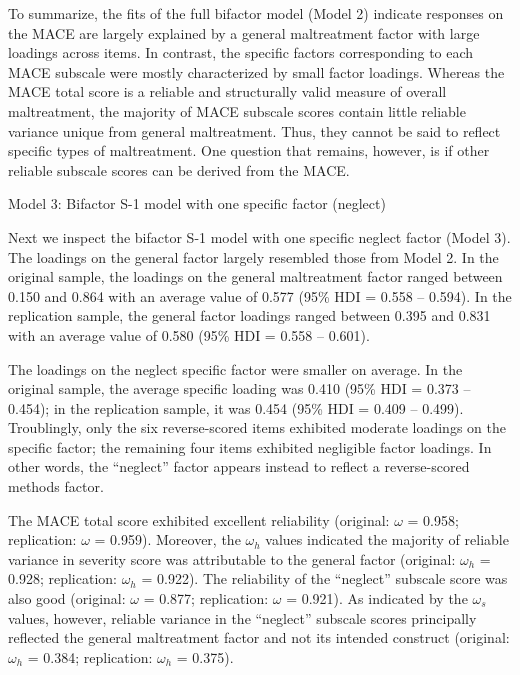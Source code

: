 \documentclass[letterpaper,man,natbib,longtable,floatsintext,12pt]{apa6}
\makeatletter
\renewcommand{\subsubsection}{\@startsection{subsubsection}{3}
  {\z@}%
  {\b@level@two@skip}{\e@level@two@skip}%
  {\normalfont\normalsize\bfseries}}
\makeatother
\begin{document}
To summarize, the fits of the full bifactor model (Model 2) indicate responses on the MACE are largely explained by a general maltreatment factor with large loadings across items. In contrast, the specific factors corresponding to each MACE subscale were mostly characterized by small factor loadings. Whereas the MACE total score is a reliable and structurally valid measure of overall maltreatment, the majority of MACE subscale scores contain little reliable variance unique from general maltreatment. Thus, they cannot be said to reflect specific types of maltreatment. One question that remains, however, is if other reliable subscale scores can be derived from the MACE. 

\subsubsection{Model 3: Bifactor S-1 model with one specific factor (neglect)}

Next we inspect the bifactor S-1 model with one specific neglect factor (Model 3). The loadings on the general factor largely resembled those from Model 2. In the original sample, the loadings on the general maltreatment factor ranged between 0.150 and 0.864 with an average value of 0.577 (95\% HDI = 0.558 -- 0.594). In the replication sample, the general factor loadings ranged between 0.395 and 0.831 with an average value of 0.580 (95\% HDI = 0.558 -- 0.601). 

The loadings on the neglect specific factor were smaller on average. In the original sample, the average specific loading was 0.410 (95\% HDI = 0.373 -- 0.454); in the replication sample, it was 0.454 (95\% HDI = 0.409 -- 0.499). Troublingly, only the six reverse-scored items exhibited moderate loadings on the specific factor; the remaining four items exhibited negligible factor loadings. In other words, the ``neglect'' factor appears instead to reflect a reverse-scored methods factor.

The MACE total score exhibited excellent reliability (original: $\omega$ = 0.958; replication: $\omega$ = 0.959). Moreover, the $\omega_h$ values indicated the majority of reliable variance in severity score was attributable to the general factor (original: $\omega_h$ = 0.928; replication: $\omega_h$ = 0.922). The reliability of the ``neglect'' subscale score was also good (original: $\omega$ = 0.877; replication: $\omega$ = 0.921). As indicated by the $\omega_s$ values, however, reliable variance in the ``neglect'' subscale scores principally reflected the general maltreatment factor and not its intended construct (original: $\omega_h$ = 0.384; replication: $\omega_h$ = 0.375). 
\end{document}

